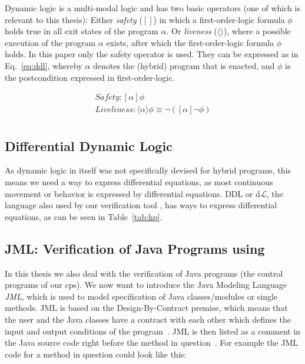 Dynamic logic is a multi-modal logic and has two basic operators (one of which is relevant to this thesis): Either \textit{safety} (\([]\)) in which a first-order-logic formula \(\phi\) holds true in all exit states of the program \(\alpha\). Or \textit{liveness} (\(\langle\rangle\)), where a possible execution of the program \(\alpha\) exists, after which the first-order-logic formula \(\phi\) holds. In this paper only the safety operator is used. They can be expressed as in Eq.~\ref{eq:ddl}, whereby \(\alpha\) denotes the (hybrid) program that is enacted, and \(\phi\) is the postcondition expressed in first-order-logic.

\begin{equation}
	\begin{split}
		Safety: [\alpha]\phi \\
		Liveliness: \langle\alpha\rangle\phi \equiv \neg ([\alpha] \neg \phi) \\
	\end{split}
	\label{eq:ddl}
\end{equation}

\subsection{Differential Dynamic Logic}
\label{subsec:DDL}

As dynamic logic in itself was not specifically devised for hybrid programs, this means we need a way to express differential equations, as most continuous movement or behavior is expressed by differential equations. DDL or d\(\mathcal{L}\), the language also used by our verification tool \keym, has ways to express differential equations, as can be seen in Table~\ref{tab:hp}.

\subsection{JML: Verification of Java Programs using \key}
\label{subsec:jml}

In this thesis we also deal with the verification of Java programs (the control programs of our cps). We now want to introduce the Java Modeling Language \textit{JML}, which is used to model specification of Java classes/modules or single methods. JML is based on the Design-By-Contract premise, which means that the user and the Java classes have a contract with each other which defines the input and output conditions of the program~\cite{keybook2007}. JML is then listed as a comment in the Java source code right before the method in question~\cite{fmcoKeYTutorial06}. For example the JML code for a method in question could look like this:


